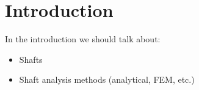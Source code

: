 \section{Introduction}
In the introduction we should talk about:
\begin{itemize}
\item Shafts
\item Shaft analysis methods (analytical, FEM, etc.)
\end{itemize}

% 
